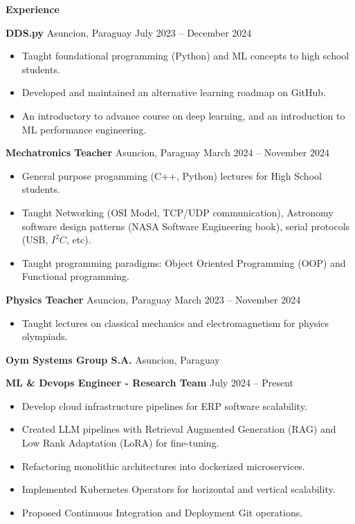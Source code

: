 \documentclass[11pt]{article}
\begin{document}
\begin{center}
    \textbf{Experience}
\end{center}

\textbf{DDS.py}	\hfill Asuncion, Paraguay
\hfill July 2023 – December 2024
\begin{itemize}[noitemsep]
  \item Taught foundational programming (Python) and ML concepts to high school students.
  \item Developed and maintained an alternative learning roadmap on GitHub.
  \item An introductory to advance course on deep learning, and an introduction to ML performance engineering.
\end{itemize}


\textbf{Mechatronics Teacher}	\hfill Asuncion, Paraguay
\hfill March 2024 – November 2024
\begin{itemize}[noitemsep]
  \item General purpose progamming (C++, Python) lectures for High School students.
  \item Taught Networking (OSI Model, TCP/UDP communication), Astronomy software design patterns (NASA Software Engineering book), serial protocols (USB, $I^{2}C$, etc).
  \item Taught programming paradigms: Object Oriented Programming (OOP) and Functional programming.
\end{itemize}

\textbf{Physics Teacher}	\hfill Asuncion, Paraguay
\hfill March 2023 – November 2024
\begin{itemize}[noitemsep]
  \item Taught lectures on classical mechanics and electromagnetism for physics olympiads.
\end{itemize}

\textbf{Oym Systems Group S.A.}	\hfill Asuncion, Paraguay

\textbf{ML \& Devops Engineer - Research Team} \hfill July 2024 – Present
\begin{itemize}[noitemsep]
  \item Develop cloud infrastructure pipelines for ERP software scalability.
  \item Created LLM pipelines with Retrieval Augmented Generation (RAG) and Low Rank Adaptation (LoRA) for fine-tuning.
  \item Refactoring monolithic architectures into dockerized microservices.
  \item Implemented Kubernetes Operators for horizontal and vertical scalability.
  \item Proposed Continuous Integration and Deployment Git operations.
\end{itemize}
\end{document}
